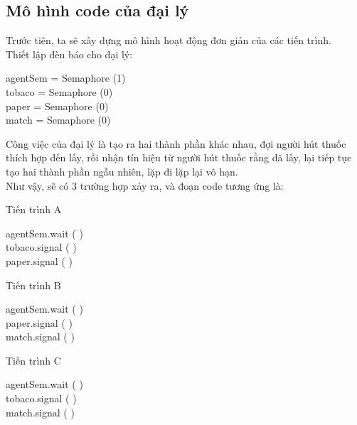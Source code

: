 \documentclass[a4paper]{article}
\begin{document}
	\subsection{Mô hình code của đại lý}
	Trước tiên, ta sẽ xây dựng mô hình hoạt động đơn giản của các tiến trình. \\[0.5cm]
	Thiết lập đèn báo cho đại lý:
	\begin{tcolorbox}
		agentSem = Semaphore (1)\\
		tobaco = Semaphore (0)\\
		paper = Semaphore (0)\\
		match = Semaphore (0)
	\end{tcolorbox}
	\hspace{4mm} Công việc của đại lý là tạo ra hai thành phần khác nhau, đợi người hút thuốc thích hợp đến lấy,
	rồi nhận tín hiệu từ người hút thuốc rằng đã lấy, lại tiếp tục tạo hai thành phần ngẫu nhiên, lặp đi lặp lại vô hạn. \\
	Như vậy, sẽ có 3 trường hợp xảy ra, và đoạn code tương ứng là:
	\\
	\begin{center}
	Tiến trình A
	\begin{tcolorbox}
		agentSem.wait ( ) \\
		tobaco.signal ( ) \\
		paper.signal ( )
	\end{tcolorbox} 
	\end{center}
	\begin{center}
	{Tiến trình B}
	\begin{tcolorbox}
		agentSem.wait ( ) \\
		paper.signal ( ) \\
		match.signal ( )
	\end{tcolorbox} 
	\end{center}
	\begin{center}
	{Tiến trình C}
	\begin{tcolorbox}
		agentSem.wait ( ) \\
		tobaco.signal ( ) \\
		match.signal ( )
	\end{tcolorbox}	
	\end{center}
	
\end{document}
